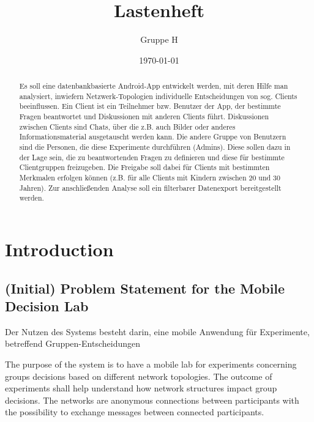 \documentclass[a4paper, 10pt]{scrreprt}
\title{Lastenheft}
\author{Gruppe H}
\date{\today}
\begin{document}
\maketitle


\tableofcontents


\begin{abstract}
 
Es soll eine datenbankbasierte Android-App entwickelt werden, 
mit deren Hilfe man analysiert, inwiefern Netzwerk-Topologien individuelle Entscheidungen von sog. Clients beeinflussen. 
Ein Client ist ein Teilnehmer bzw. Benutzer der App, der bestimmte Fragen beantwortet und Diskussionen mit anderen Clients führt. 
Diskussionen zwischen Clients sind Chats, über die z.B. auch Bilder oder anderes Informationsmaterial ausgetauscht werden kann. 
Die andere Gruppe von Benutzern sind die Personen, die diese Experimente durchführen (Admins). 
Diese sollen dazu in der Lage sein, die zu beantwortenden Fragen zu definieren und diese für bestimmte Clientgruppen freizugeben. 
Die Freigabe soll dabei für Clients mit bestimmten Merkmalen erfolgen können (z.B. für alle Clients mit Kindern zwischen 20 und 30 Jahren). 
Zur anschließenden Analyse soll ein filterbarer Datenexport bereitgestellt werden.

\end{abstract}







\chapter{Introduction}

\section{(Initial) Problem Statement for the Mobile Decision Lab}
Der Nutzen des Systems besteht darin, eine mobile Anwendung für Experimente, betreffend Gruppen-Entscheidungen 

The purpose of the system is to have a mobile lab for experiments concerning groups decisions based on different network topologies. The outcome of experiments shall help understand how network structures impact group decisions. The networks are anonymous connections between participants with the possibility to exchange messages between connected participants.
\end{document}
